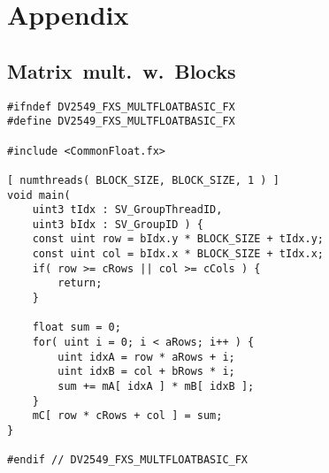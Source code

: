 \documentclass[fleqn,10pt]{SelfArx} %
\newlength{\tocsep}
\begin{document}


\section*{Appendix}
\label{sec:appendix}
\subsection*{Matrix~mult.~w.~Blocks}
\begin{lstlisting}
#ifndef DV2549_FXS_MULTFLOATBASIC_FX
#define DV2549_FXS_MULTFLOATBASIC_FX

#include <CommonFloat.fx>

[ numthreads( BLOCK_SIZE, BLOCK_SIZE, 1 ) ]
void main(
	uint3 tIdx : SV_GroupThreadID,
	uint3 bIdx : SV_GroupID ) {
	const uint row = bIdx.y * BLOCK_SIZE + tIdx.y;
	const uint col = bIdx.x * BLOCK_SIZE + tIdx.x;
	if( row >= cRows || col >= cCols ) {
		return;
	}
        
	float sum = 0;
	for( uint i = 0; i < aRows; i++ ) {
		uint idxA = row * aRows + i;
		uint idxB = col + bRows * i;
		sum += mA[ idxA ] * mB[ idxB ];
	}
	mC[ row * cRows + col ] = sum;
}

#endif // DV2549_FXS_MULTFLOATBASIC_FX
\end{lstlisting}
\end{document}

